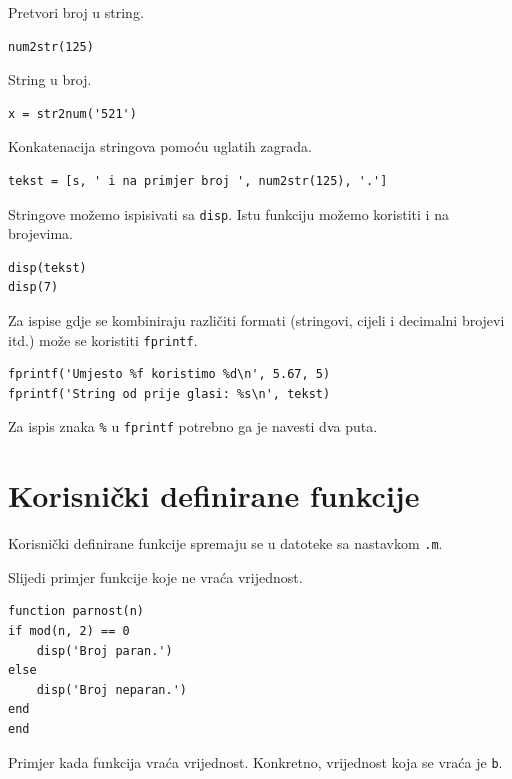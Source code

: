 \documentclass[a4paper, 10pt]{article}
\newcommand{\spec}[1]{\texttt{#1}} %
\begin{document}
Pretvori broj u string.

\begin{lstlisting}
num2str(125)
\end{lstlisting}

String u broj.

\begin{lstlisting}
x = str2num('521')
\end{lstlisting}

Konkatenacija stringova pomoću uglatih zagrada.

\begin{lstlisting}
tekst = [s, ' i na primjer broj ', num2str(125), '.']
\end{lstlisting}

Stringove možemo ispisivati sa \spec{disp}.
Istu funkciju možemo koristiti i na brojevima.

\begin{lstlisting}
disp(tekst)
disp(7)
\end{lstlisting}

Za ispise gdje se kombiniraju različiti formati (stringovi, cijeli i decimalni brojevi itd.) može se koristiti \spec{fprintf}.

\begin{lstlisting}
fprintf('Umjesto %f koristimo %d\n', 5.67, 5)
fprintf('String od prije glasi: %s\n', tekst)
\end{lstlisting}

Za ispis znaka \spec{\%} u \spec{fprintf} potrebno ga je navesti dva puta.


\section{Korisnički definirane funkcije}

Korisnički definirane funkcije spremaju se u datoteke sa nastavkom \spec{.m}.

Slijedi primjer funkcije koje ne vraća vrijednost.

\begin{lstlisting}
function parnost(n)
if mod(n, 2) == 0
    disp('Broj paran.')
else
    disp('Broj neparan.')
end
end
\end{lstlisting}

\pagebreak

Primjer kada funkcija vraća vrijednost.
Konkretno, vrijednost koja se vraća je \spec{b}.
\end{document}
